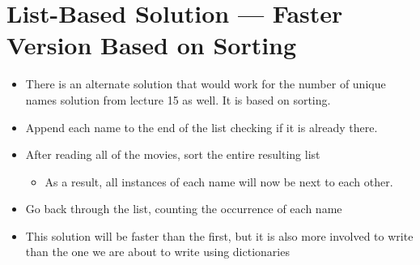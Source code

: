 \documentclass[letterpaper,10pt,english]{sphinxmanual}
\begin{document}
\section{List-Based Solution — Faster Version Based on Sorting}
\label{\detokenize{lecture_notes/lec16_dictionaries1:list-based-solution-faster-version-based-on-sorting}}\begin{itemize}
\item {} 
There is an alternate solution that would work for the number of unique names solution from
lecture 15 as well. It is based on sorting.

\item {} 
Append each name to the end of the list  checking if it is
already there.

\item {} 
After reading all of the movies, sort the entire resulting list
\begin{itemize}
\item {} 
As a result, all instances of each name will now be next to each
other.

\end{itemize}

\item {} 
Go back through the list, counting the occurrence of each name

\item {} 
This solution will be  faster than the first, but it is also
more involved to write than the one we are about to write using
dictionaries

\end{itemize}
\end{document}
